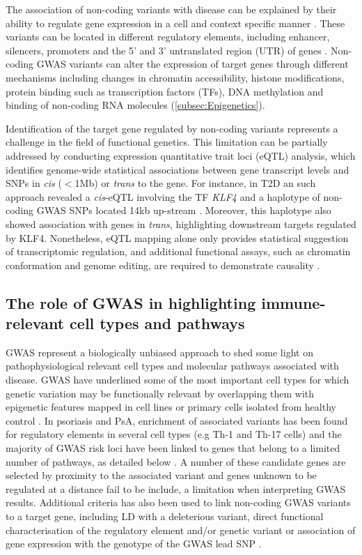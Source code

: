 The association of non-coding variants with disease can be explained by their ability to regulate gene expression in a cell and context specific manner \parencite{Fairfax2012}. These variants can be located in different regulatory elements, including enhancer, silencers, promoters and the 5' and 3' untranslated region (UTR) of genes \parencite{Ward2012}. Non-coding GWAS variants can alter the expression of target genes through different mechanisms including changes in chromatin accessibility, histone modifications, protein binding such as transcription factors (TFs), DNA methylation and binding of non-coding RNA molecules \parencite{Knight2014} (\ref{subsec:Epigenetics}).

Identification of the target gene regulated by non-coding variants represents a challenge in the field of functional genetics. This limitation can be partially addressed by conducting expression quantitative trait loci (eQTL) analysis, which identifies genome-wide statistical associations between gene transcript levels and SNPs in \textit{cis} ($<$1Mb) or \textit{trans} to the gene. For instance, in T2D an such approach revealed a \textit{cis}-eQTL involving the TF \textit{KLF4} and a haplotype of non-coding GWAS SNPs located 14kb up-stream \parencite{Small2011}. Moreover, this haplotype also showed association with genes in \textit{trans}, highlighting downstream targets regulated by KLF4. Nonetheless, eQTL mapping alone only provides statistical suggestion of transcriptomic regulation, and additional functional assays, such as chromatin conformation and genome editing, are required to demonstrate causality \parencite{Edwards2013}.  
 


\subsection{The role of GWAS in highlighting immune-relevant cell types and pathways}

\textcolor[rgb]{1,0,0}{GWAS represent a biologically unbiased approach to shed  some  light on pathophysiological relevant cell types and molecular pathways associated with disease. GWAS have underlined some of the most important cell types for which genetic variation may be functionally relevant by overlapping them with epigenetic features mapped in cell lines or primary cells isolated from healthy control \parencite{Farh2015}. In psoriasis and PsA, enrichment of associated variants has been found for regulatory elements in several cell types (e.g Th-1 and Th-17 cells) and the majority of GWAS risk loci have been linked to genes that belong to a limited number of pathways, as detailed below \parencite{Tsoi2017,Capon2017}. A number of these candidate genes are selected by proximity to the associated variant and genes unknown to be regulated at a distance fail to be include, a limitation when interpreting GWAS results. Additional criteria has also been used to link non-coding GWAS variants to a target gene, including LD with a deleterious variant, direct functional characterisation of the regulatory element and/or genetic variant or association of gene expression with the genotype of the GWAS lead SNP \parencite{Capon2008,Tsoi2012,Tsoi2017,Meglio2011}}.  


